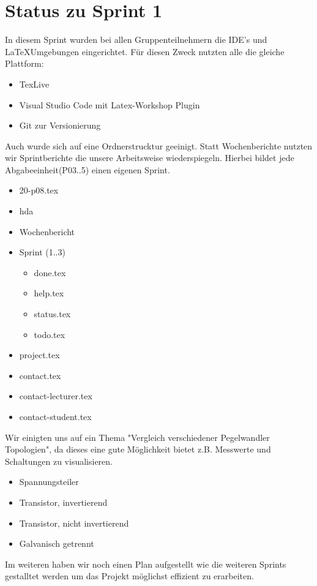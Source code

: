 \section{Status zu Sprint 1
}\label{sec:status}

In diesem Sprint wurden bei allen Gruppenteilnehmern die IDE's und \LaTeX Umgebungen eingerichtet.
Für diesen Zweck nutzten alle die gleiche Plattform:
\begin{itemize}
  \item TexLive
  \item Visual Studio Code mit Latex-Workshop Plugin
  \item Git zur Versionierung
\end{itemize}
Auch wurde sich auf eine Ordnerstrucktur geeinigt. Statt Wochenberichte nutzten wir Sprintberichte die unsere Arbeitsweise wiederspiegeln.
Hierbei bildet jede Abgabeeinheit(P03..5) einen eigenen Sprint.
\begin{itemize}
  \item 20-p08.tex
  \item hda
  \item Wochenbericht
  \item Sprint (1..3)
  \begin{itemize}
    \item done.tex
    \item help.tex
    \item status.tex
    \item todo.tex
  \end{itemize}
  \item project.tex
  \item contact.tex
  \item contact-lecturer.tex
  \item contact-student.tex
\end{itemize}
Wir einigten uns auf ein Thema "Vergleich verschiedener Pegelwandler Topologien", da dieses eine gute Möglichkeit bietet z.B. Messwerte und Schaltungen zu visualisieren.
\begin{itemize}
  \item Spannungsteiler
  \item Transistor, invertierend
  \item Transistor, nicht invertierend
  \item Galvanisch getrennt
\end{itemize}
Im weiteren haben wir noch einen Plan aufgestellt wie die weiteren Sprints gestalltet werden um das Projekt möglichst effizient zu erarbeiten.

